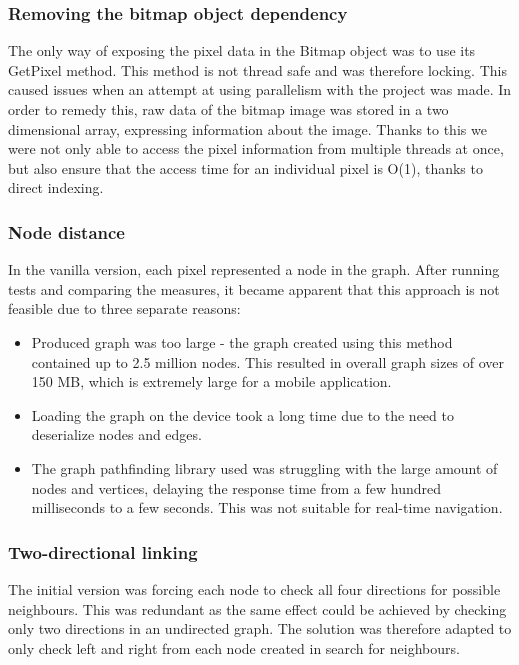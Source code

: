 \documentclass[12pt,a4paper]{report}
\begin{document}
\subsubsection{Removing the bitmap object dependency}

The only way of exposing the pixel data in the Bitmap object was to use its GetPixel method. This method is not thread safe and was therefore locking. This caused issues when an attempt at using parallelism with the project was made. In order to remedy this, raw data of the bitmap image was stored in a two dimensional array, expressing information about the image. Thanks to this we were not only able to access the pixel information from multiple threads at once, but also ensure that the access time for an individual pixel is O(1), thanks to direct indexing. 

\subsubsection{Node distance}
In the vanilla version, each pixel represented a node in the graph. After running tests and comparing the measures, it became apparent that this approach is not feasible due to three separate reasons:
	
\begin{itemize}

\item Produced graph was too large - the graph created using this method contained up to 2.5 million nodes. This resulted in overall graph sizes of over 150 MB, which is extremely large for a mobile application.

\item Loading the graph on the device took a long time due to the need to deserialize nodes and edges.

\item The graph pathfinding library used was struggling with the large amount of nodes and vertices, delaying the response time from a few hundred milliseconds to a few seconds. This was not suitable for real-time navigation.

\end{itemize}
	

\subsubsection{Two-directional linking}
	
The initial version was forcing each node to check all four directions for possible neighbours. This was redundant as the same effect could be achieved by checking only two directions in an undirected graph. The solution was therefore adapted to only check left and right from each node created in search for neighbours.
\end{document}
